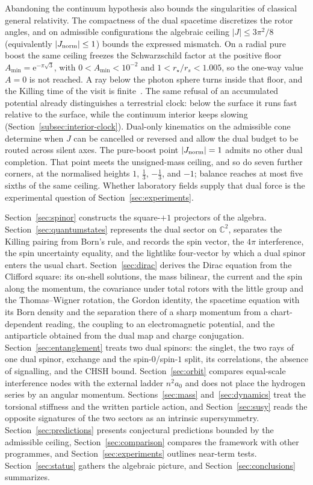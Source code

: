 \documentclass[a4paper]{article}
\begin{document}
Abandoning the continuum hypothesis also bounds the singularities of classical general relativity. The compactness of the dual spacetime discretizes the rotor angles, and on admissible configurations the algebraic ceiling $|J|\le 3\pi^2/8$ (equivalently $|J_{\rm norm}|\le 1$) bounds the expressed mismatch. On a radial pure boost the same ceiling freezes the Schwarzschild factor at the positive floor \(A_{\min}=\mathrm{e}^{-\pi\sqrt{3}}\), with \(0<A_{\min}<10^{-2}\) and \(1<r_\star/r_s<1.005\), so the one-way value \(A=0\) is not reached. A ray below the photon sphere turns inside that floor, and the Killing time of the visit is finite~\cite{dst-lensing}. The same refusal of an accumulated potential already distinguishes a terrestrial clock: below the surface it runs fast relative to the surface, while the continuum interior keeps slowing (Section~\ref{subsec:interior-clock}). Dual-only kinematics on the admissible cone determine when $J$ can be cancelled or reversed and allow the dual budget to be routed across silent axes. The pure-boost point $|J_{\rm norm}|=1$ admits no other dual completion. That point meets the unsigned-mass ceiling, and so do seven further corners, at the normalised heights $1$, $\frac13$, $-\frac13$, and $-1$; balance reaches at most five sixths of the same ceiling. Whether laboratory fields supply that dual force is the experimental question of Section~\ref{sec:experiments}.

Section~\ref{sec:spinor} constructs the square-$+1$ projectors of the algebra. Section~\ref{sec:quantumstates} represents the dual sector on $\mathbb{C}^2$, separates the Killing pairing from Born's rule, and records the spin vector, the $4\pi$ interference, the spin uncertainty equality, and the lightlike four-vector by which a dual spinor enters the usual chart. Section~\ref{sec:dirac} derives the Dirac equation from the Clifford square: its on-shell solutions, the mass bilinear, the current and the spin along the momentum, the covariance under total rotors with the little group and the Thomas--Wigner rotation, the Gordon identity, the spacetime equation with its Born density and the separation there of a sharp momentum from a chart-dependent reading, the coupling to an electromagnetic potential, and the antiparticle obtained from the dual map and charge conjugation. Section~\ref{sec:entanglement} treats two dual spinors: the singlet, the two rays of one dual spinor, exchange and the spin-$0$/spin-$1$ split, its correlations, the absence of signalling, and the CHSH bound. Section~\ref{sec:orbit} compares equal-scale interference nodes with the external ladder $n^2 a_0$ and does not place the hydrogen series by an angular momentum. Sections~\ref{sec:mass} and~\ref{sec:dynamics} treat the torsional stiffness and the written particle action, and Section~\ref{sec:susy} reads the opposite signatures of the two sectors as an intrinsic supersymmetry. Section~\ref{sec:predictions} presents conjectural predictions bounded by the admissible ceiling, Section~\ref{sec:comparison} compares the framework with other programmes, and Section~\ref{sec:experiments} outlines near-term tests. Section~\ref{sec:status} gathers the algebraic picture, and Section~\ref{sec:conclusions} summarizes.
\end{document}
